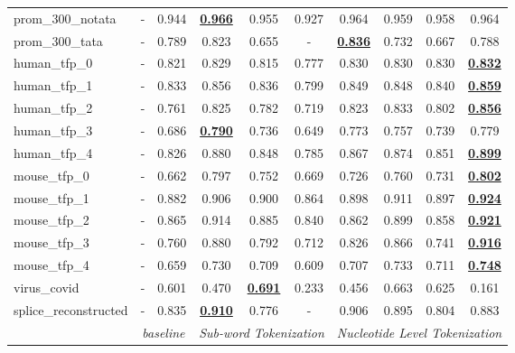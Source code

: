 \begin{table*}[h!]
\begin{center}
\begin{tabular}{l|cc|ccc|cccc}
prom\_300\_notata & - & 0.944 & {\ul \textbf{0.966}} & 0.955 & 0.927 & 0.964 & 0.959 & 0.958 & 0.964 \\
prom\_300\_tata & - & 0.789 & 0.823 & 0.655 & - & {\ul \textbf{0.836}} & 0.732 & 0.667 & 0.788 \\
human\_tfp\_0 & - & 0.821 & 0.829 & 0.815 & 0.777 & 0.830 & 0.830 & 0.830 & {\ul \textbf{0.832}} \\
human\_tfp\_1 & - & 0.833 & 0.856 & 0.836 & 0.799 & 0.849 & 0.848 & 0.840 & {\ul \textbf{0.859}} \\
human\_tfp\_2 & - & 0.761 & 0.825 & 0.782 & 0.719 & 0.823 & 0.833 & 0.802 & {\ul \textbf{0.856}} \\
human\_tfp\_3 & - & 0.686 & {\ul \textbf{0.790}} & 0.736 & 0.649 & 0.773 & 0.757 & 0.739 & 0.779 \\
human\_tfp\_4 & - & 0.826 & 0.880 & 0.848 & 0.785 & 0.867 & 0.874 & 0.851 & {\ul \textbf{0.899}} \\
mouse\_tfp\_0 & - & 0.662 & 0.797 & 0.752 & 0.669 & 0.726 & 0.760 & 0.731 & {\ul \textbf{0.802}} \\
mouse\_tfp\_1 & - & 0.882 & 0.906 & 0.900 & 0.864 & 0.898 & 0.911 & 0.897 & {\ul \textbf{0.924}} \\
mouse\_tfp\_2 & - & 0.865 & 0.914 & 0.885 & 0.840 & 0.862 & 0.899 & 0.858 & {\ul \textbf{0.921}} \\
mouse\_tfp\_3 & - & 0.760 & 0.880 & 0.792 & 0.712 & 0.826 & 0.866 & 0.741 & {\ul \textbf{0.916}} \\
mouse\_tfp\_4 & - & 0.659 & 0.730 & 0.709 & 0.609 & 0.707 & 0.733 & 0.711 & {\ul \textbf{0.748}} \\
virus\_covid & - & 0.601 & 0.470 & {\ul \textbf{0.691}} & 0.233 & 0.456 & 0.663 & 0.625 & 0.161 \\
splice\_reconstructed & - & 0.835 & {\ul \textbf{0.910}} & 0.776 & - & 0.906 & 0.895 & 0.804 & 0.883 \\
\hline
\multicolumn{1}{l|}{} & \multicolumn{2}{c|}{\textit{baseline}} & \multicolumn{3}{c|}{\textit{Sub-word Tokenization}} & \multicolumn{4}{c}{\textit{Nucleotide Level Tokenization}} \\ \hline
\end{tabular}
\end{center}
\end{table*}
